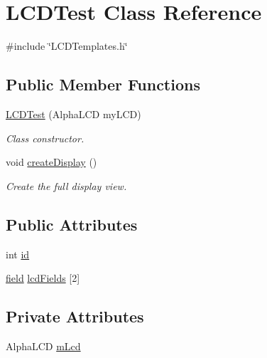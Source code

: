 \hypertarget{class_l_c_d_test}{\section{L\-C\-D\-Test Class Reference}
\label{class_l_c_d_test}
}


{\ttfamily \#include \char`\"{}L\-C\-D\-Templates.\-h\char`\"{}}

\subsection*{Public Member Functions}
\begin{DoxyCompactItemize}
\item 
\hyperlink{class_l_c_d_test_ad0ff9a1cdf043b5d713a0c304db655e6}{L\-C\-D\-Test} (Alpha\-L\-C\-D my\-L\-C\-D)
\begin{DoxyCompactList}\small\item\em Class constructor. \end{DoxyCompactList}\item 
void \hyperlink{class_l_c_d_test_a836e4ebb041e103575965cd56e069992}{create\-Display} ()
\begin{DoxyCompactList}\small\item\em Create the full display view. \end{DoxyCompactList}\end{DoxyCompactItemize}
\subsection*{Public Attributes}
\begin{DoxyCompactItemize}
\item 
int \hyperlink{class_l_c_d_test_a2ff27dfccb55b9a130732f8bafbd2638}{id}
\item 
\hyperlink{_l_c_d_templates_8h_a20a49e010fbfc3a43959f12d92e01bb6}{field} \hyperlink{class_l_c_d_test_ab14e67bbc0e88f2395d8fd52d1826423}{lcd\-Fields} \mbox{[}2\mbox{]}
\end{DoxyCompactItemize}
\subsection*{Private Attributes}
\begin{DoxyCompactItemize}
\item 
Alpha\-L\-C\-D \hyperlink{class_l_c_d_test_a4d8379716e37edc20fafb9c4a24c253f}{m\-Lcd}
\end{DoxyCompactItemize}


